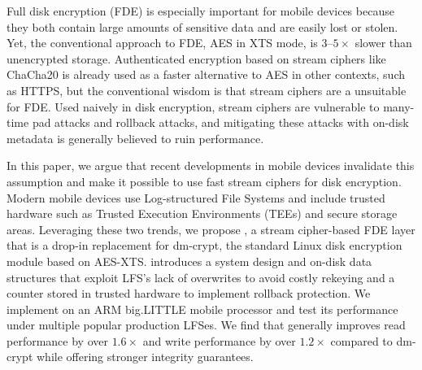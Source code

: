 \abstract
Full disk encryption (FDE) is especially important for mobile devices because
they both contain large amounts of sensitive data and are easily lost or stolen.
Yet, the conventional approach to FDE, AES in XTS mode, is 3--$5\times$ slower
than unencrypted storage. Authenticated encryption based on stream ciphers like
ChaCha20 is already used as a faster alternative to AES in other contexts, such
as HTTPS, but the conventional wisdom is that stream ciphers are a unsuitable
for FDE. Used naively in disk encryption, stream ciphers are vulnerable to
many-time pad attacks and rollback attacks, and mitigating these attacks with
on-disk metadata is generally believed to ruin performance.

In this paper, we argue that recent developments in mobile devices invalidate
this assumption and make it possible to use fast stream ciphers for disk
encryption. Modern mobile devices use Log-structured File Systems and include
trusted hardware such as Trusted Execution Environments (TEEs) and secure
storage areas. Leveraging these two trends, we propose \SYSTEM{}, a stream
cipher-based FDE layer that is a drop-in replacement for dm-crypt, the standard
Linux disk encryption module based on AES-XTS. \SYSTEM{} introduces a system
design and on-disk data structures that exploit LFS's lack of overwrites to
avoid costly rekeying and a counter stored in trusted hardware to implement
rollback protection. We implement \SYSTEM{} on an ARM big.LITTLE mobile
processor and test its performance under multiple popular production LFSes. We
find that \SYSTEM{} generally improves read performance by over $1.6\times$ and
write performance by over $1.2\times$ compared to dm-crypt while offering
stronger integrity guarantees.
